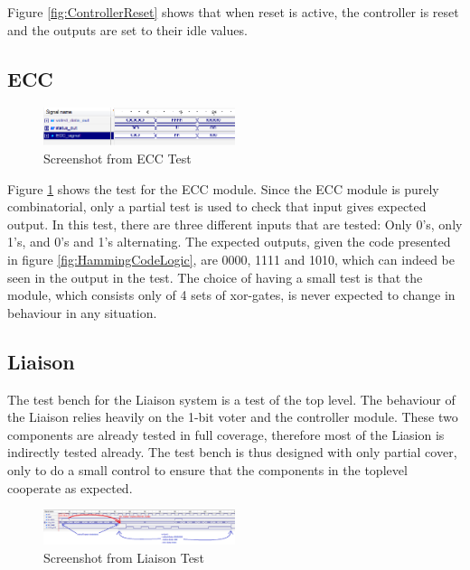 \documentclass[a4paper]{IEEEtran}
\begin{document}
Figure \ref{fig:ControllerReset} shows that when reset is active, the controller is reset and the outputs are set to their idle values.

\subsection{ ECC }

\begin{figure}[h!]
  \centering
      \includegraphics[width=0.5\textwidth]{Figures/Tests/ECCTest}
  \caption{Screenshot from ECC Test}
  \label{fig:ECCTest}
\end{figure}

Figure \ref{fig:ECCTest} shows the test for the ECC module.
Since the ECC module is purely combinatorial, only a partial test is used to check that input gives expected output.
In this test, there are three different inputs that are tested: Only 0's, only 1's, and 0's and 1's alternating. The expected outputs, given the code presented in figure \ref{fig:HammingCodeLogic}, are 0000, 1111 and 1010, which can indeed be seen in the output in the test.
The choice of having a small test is that the module, which consists only of 4 sets of xor-gates, is never expected to change in behaviour in any situation.

\subsection{ Liaison }
The test bench for the Liaison system is a test of the top level.
The behaviour of the Liaison relies heavily on the 1-bit voter and the controller module.
These two components are already tested in full coverage, therefore most of the Liasion is indirectly tested already.
The test bench is thus designed with only partial cover, only to do a small control to ensure that the components in the toplevel cooperate as expected.

\begin{figure}[h!]
    \centering
    \includegraphics[width=0.5\textwidth]{Figures/Tests/LiaisonTest}
    \caption{Screenshot from Liaison Test}
    \label{fig:LiaisonTests}
\end{figure}
\end{document}
